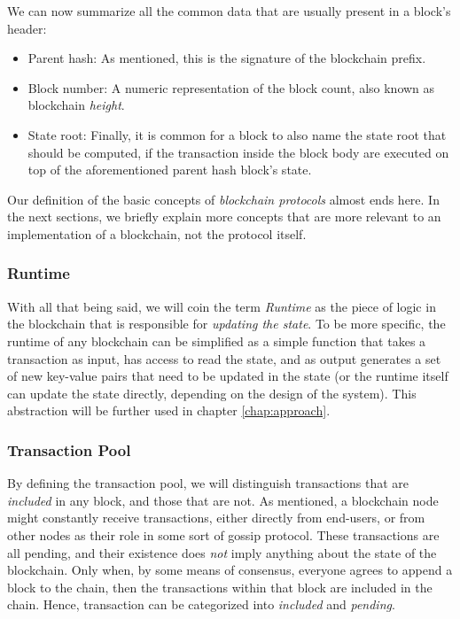 We can now summarize all the common data that are usually present in a block's header:

\begin{itemize}
	\item Parent hash: As mentioned, this is the signature of the blockchain prefix.
	\item Block number: A numeric representation of the block count, also known as blockchain
	\textit{height}.
	\item State root: Finally, it is common for a block to also name the state root that should be
	computed, if the transaction inside the block body are executed on top of the aforementioned
	parent hash block's state.
\end{itemize}

Our definition of the basic concepts of \textit{blockchain protocols} almost ends here. In the next
sections, we briefly explain more concepts that are more relevant to an implementation of a
blockchain, not the protocol itself.

\subsubsection{Runtime} \label{chap_bg:subsec:runtime}

With all that being said, we will coin the term \textit{Runtime} as the piece of logic in the
blockchain that is responsible for \textit{updating the state}. To be more specific, the runtime of
any blockchain can be simplified as a simple function that takes a transaction as input, has access
to read the state, and as output generates a set of new key-value pairs that need to be updated in
the state (or the runtime itself can update the state directly, depending on the design of the
system). This abstraction will be further used in chapter \ref{chap:approach}.

\subsubsection{Transaction Pool} \label{chap_bg:subsec:tx_pool}

By defining the transaction pool, we will distinguish transactions that are \textit{included} in any
block, and those that are not. As mentioned, a blockchain node might constantly receive
transactions, either directly from end-users, or from other nodes as their role in some sort of
gossip protocol. These transactions are all pending, and their existence does \textit{not} imply
anything about the state of the blockchain. Only when, by some means of consensus, everyone agrees
to append a block to the chain, then the transactions within that block are included in the chain.
Hence, transaction can be categorized into \textit{included} and \textit{pending}.

